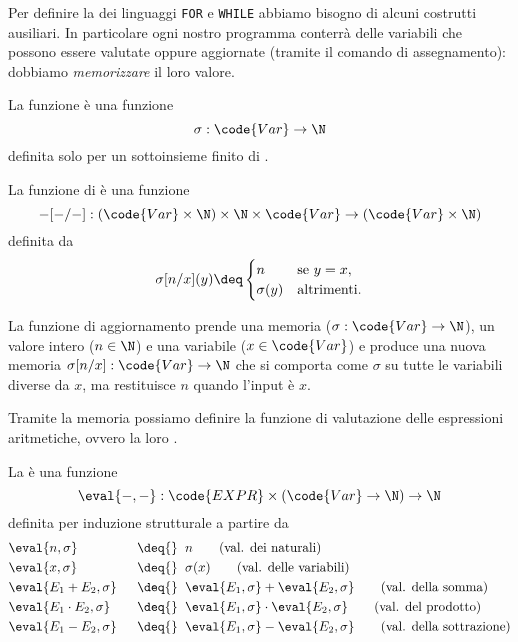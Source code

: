 Per definire la  dei linguaggi \texttt{FOR} e \texttt{WHILE} abbiamo bisogno di alcuni costrutti ausiliari. In particolare ogni nostro programma conterrà delle variabili che possono essere valutate oppure aggiornate (tramite il comando di assegnamento): dobbiamo \emph{memorizzare} il loro valore.

\begin{definition}
    La funzione  è una funzione \[
        \sigma : \code{Var} \to \N
    \] definita solo per un sottoinsieme finito di .

    La funzione di  è una funzione \[
        \blank[\blank/\blank] : (\code{Var} \times \N) \times \N \times \code{Var} \to (\code{Var} \times \N)
    \] definita da \[
        \sigma[n/x](y) \deq \begin{cases}
            n &\text{se } y = x,\\
            \sigma(y) &\text{altrimenti.}
        \end{cases}
    \]
\end{definition}

\begin{remark}
    La funzione di aggiornamento prende una memoria ($\sigma : \code{Var} \to \N$), un valore intero ($n \in \N$) e una variabile ($x \in \code{Var}$) e produce una nuova memoria $\sigma[n/x] : \code{Var} \to \N$ che si comporta come $\sigma$ su tutte le variabili diverse da $x$, ma restituisce $n$ quando l'input è $x$. 
\end{remark}

Tramite la memoria possiamo definire la funzione di valutazione delle espressioni aritmetiche, ovvero la loro .

\begin{definition}
    La  è una funzione \[
        \eval{\blank, \blank} : \code{EXPR} \times (\code{Var} \to \N) \to \N 
    \]
    definita per induzione strutturale a partire da 
    \begin{alignat*}{2}
        &\eval{n, \sigma} &&\;\;\deq{}\;\; n \tag{val. dei naturali}\\
        &\eval{x, \sigma} &&\;\;\deq{}\;\; \sigma(x) \tag{val. delle variabili}\\
        &\eval{E_1 + E_2, \sigma} &&\;\;\deq{}\;\; \eval{E_1, \sigma} + \eval{E_2, \sigma} \tag{val. della somma}\\
        &\eval{E_1 \cdot E_2, \sigma} &&\;\;\deq{}\;\; \eval{E_1, \sigma} \cdot \eval{E_2, \sigma}  \tag{val. del prodotto}\\
        &\eval{E_1 - E_2, \sigma} &&\;\;\deq{}\;\; \eval{E_1, \sigma} - \eval{E_2, \sigma} \tag{val. della sottrazione}
    \end{alignat*}
\end{definition}

